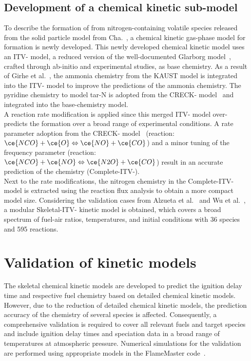 \begin{refsection}
\subsection{Development of a  chemical kinetic sub-model}
To describe the formation of  from nitrogen-containing volatile species released from the solid particle model from Cha.~, a chemical kinetic gas-phase model for  formation is newly developed. This newly developed chemical kinetic model uses an ITV- model, a reduced version of the well-documented Glarborg model~\cite{Glarborg2018}, crafted through ab-initio and experimental studies, as base chemistry. As a result of Girhe et al.~\cite{Girhe2024}, the ammonia chemistry from the KAUST model is integrated into the ITV- model to improve the predictions of the ammonia chemistry. The pyridine chemistry to model tar-N is adopted from the CRECK- model~\cite{Shamooni2021} and integrated into the base-chemistry model.
\\
A reaction rate modification is applied since this merged ITV- model over-predicts the  formation over a broad range of experimental conditions. A rate parameter adoption from the CRECK- model~\cite{Shamooni2021} (reaction: $\ce{NCO}+\ce{O} \Leftrightarrow \ce{NO}+\ce{CO}$) and a minor tuning of the frequency parameter (reaction: $\ce{NCO}+\ce{NO} \Leftrightarrow \ce{N2O}+\ce{CO}$) result in an accurate prediction of the  chemistry (Complete-ITV-).
\\
Next to the rate modifications, the nitrogen chemistry in the Complete-ITV- model is extracted using the reaction flux analysis to obtain a more compact model size. Considering the validation cases from Alzueta et al.~\cite{Alzueta2002} and Wu et al.~\cite{Wu2019, Wu2022}, a modular Skeletal-ITV- kinetic model is obtained, which covers a broad spectrum of fuel-air ratios, temperatures, and initial conditions with 36 species and 595 reactions.




\newpage
\section{Validation of kinetic models}
The skeletal chemical kinetic models are developed to predict the ignition delay time and respective fuel chemistry based on detailed chemical kinetic models. However, due to the reduction of detailed chemical kinetic models, the prediction accuracy of the chemistry of several species is affected. Consequently, a comprehensive validation is required to cover all relevant fuels and target species and include ignition delay times and speciation data in a broad range of temperatures at atmospheric pressure. Numerical simulations for the validation are performed using appropriate models in the FlameMaster code~\cite{Pitsch1990}.



\end{refsection}

